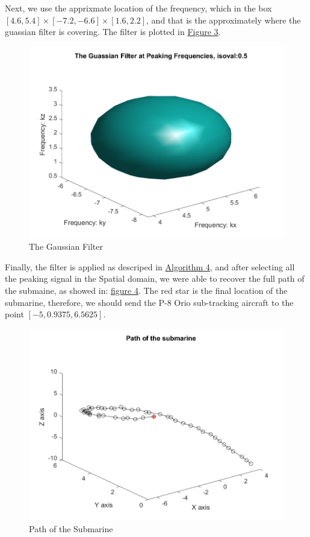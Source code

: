 \documentclass{article}
\begin{document}
    Next, we use the apprixmate location of the frequency, which in the box $[4.6, 5.4]\times [-7.2, -6.6]\times[1.6, 2.2]$, and that is the approximately where the guassian filter is covering. The filter is plotted in \hyperref[fig:guass-filter]{Figure 3}. 
    \begin{figure}[h]
        \centering
        \includegraphics*[width=0.5\linewidth]{gaussian-filter.png}
        \caption{The Gaussian Filter}
        \label{fig:guass-filter}
    \end{figure}
    Finally, the filter is applied as descriped in \hyperref[alg:algorithm4]{Algorithm 4}, and after selecting all the peaking signal in the Spatial domain, we were able to recover the full path of the submaine, as showed in: \hyperref[fig:path]{figure 4}. The red star is the final location of the submarine, therefore, we should send the P-8 Orio sub-tracking aircraft to the point $[-5, 0.9375, 6.5625]$. 
    \begin{figure}[h]
        \centering
        \includegraphics*[width=0.7\linewidth]{submarine-path.png}
        \caption{Path of the Submarine}
        \label{fig:path}
        \centering
    \end{figure}
\end{document}
